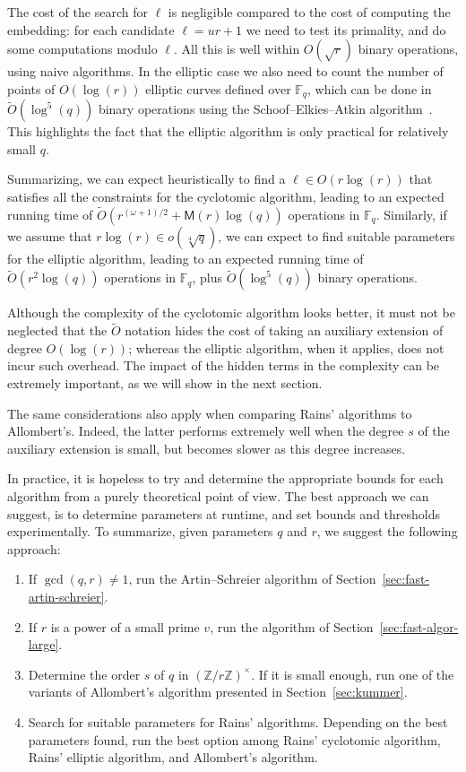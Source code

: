 \documentclass{mcom-l}
\theoremstyle{plain}
\theoremstyle{definition}
\newcommand{\tildO}{\tilde{O}}
\newcommand{\Z}{\ensuremath{\mathbb{Z}}}
\newcommand{\F}{\ensuremath{\mathbb{F}}}
\newcommand{\MM}{\ensuremath{\mathsf{M}}}
\newcounter{algorithm}
\begin{document}
The cost of the search for $\ell$ is negligible compared to the cost
of computing the embedding: for each candidate $\ell=ur+1$ we need to
test its primality, and do some computations modulo $\ell$. %
All this is well within $O(\sqrt{r})$ binary operations, using naive
algorithms. %
In the elliptic case we also need to count the number of points of
$O(\log(r))$ elliptic curves defined over $\F_q$, which can be done in
$\tildO\left(\log^5(q)\right)$ binary operations using the
Schoof--Elkies--Atkin algorithm~\cite{schoof95,lercier+sirvent08}. %
This highlights the fact that the elliptic algorithm is only practical
for relatively small $q$.

Summarizing, we can expect heuristically to find a
$\ell\in O(r\log(r))$ that satisfies all the constraints for the
cyclotomic algorithm, leading to an expected running time of
$\tildO(r^{(\omega+1)/2}+\MM(r)\log(q))$ operations in $\F_q$.  %
Similarly, if we assume that $r\log(r)\in o(\sqrt[4]{q})$, we can
expect to find suitable parameters for the elliptic algorithm, leading
to an expected running time of $\tildO(r^2\log(q))$ operations in
$\F_q$, plus $\tildO(\log^5(q))$ binary operations.

Although the complexity of the cyclotomic algorithm looks better, it
must not be neglected that the $\tildO$ notation
hides the cost of taking an auxiliary extension of degree
$O(\log(r))$; whereas the elliptic algorithm, when it applies, does
not incur such overhead. The impact of the hidden terms in the
complexity can be extremely important, as we will show in the next
section. 

The same considerations also apply when comparing Rains' algorithms to
Allombert's. Indeed, the latter performs extremely well when the
degree $s$ of the auxiliary extension is small, but becomes slower as
this degree increases.

In practice, it is hopeless to try and determine the appropriate
bounds for each algorithm from a purely theoretical point of view. The
best approach we can suggest, is to determine parameters at runtime,
and set bounds and thresholds experimentally.
To summarize, given parameters $q$ and $r$, we suggest
the following approach:
\begin{enumerate}
\item If $\gcd(q,r)\ne 1$, run the Artin--Schreier algorithm of
  Section~\ref{sec:fast-artin-schreier}.
\item If $r$ is a power of a small prime $v$, run the algorithm of
  Section~\ref{sec:fast-algor-large}.
\item Determine the order $s$ of $q$ in $(\Z/r\Z)^\times$. If it is
  small enough, run one of the variants of Allombert's algorithm
  presented in Section~\ref{sec:kummer}.
\item Search for suitable parameters for Rains' algorithms. %
  Depending on the best parameters found, run the best option among
  Rains' cyclotomic algorithm, Rains' elliptic algorithm, and
  Allombert's algorithm.
\end{enumerate}
\end{document}
